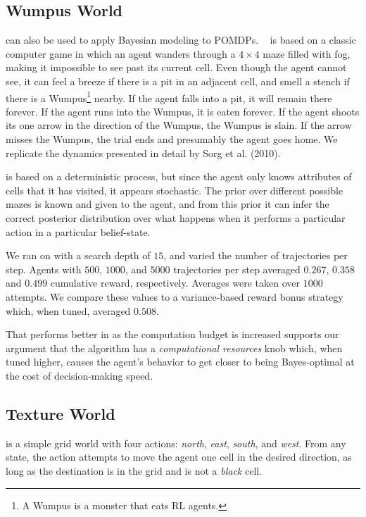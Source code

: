 \subsection{Wumpus World}

 can also be used to apply Bayesian modeling to POMDPs. ~\cite{russell94} is based on a classic computer game in which an agent wanders through a $4\times 4$ maze filled with fog, making it impossible to see past its current cell. Even though the agent cannot see, it can feel a breeze if there is a pit in an adjacent cell, and smell a stench if there is a Wumpus\footnote{A Wumpus is a monster that eats RL agents.} nearby. If the agent falls into a pit, it will remain there forever. If the agent runs into the Wumpus, it is eaten forever. If the agent shoots its one arrow in the direction of the Wumpus, the Wumpus is slain. If the arrow misses the Wumpus, the trial ends and presumably the agent goes home. We replicate the dynamics presented in detail by Sorg et al. (2010). %

 is based on a deterministic process, but since the agent only knows attributes of cells that it has visited, it appears stochastic. The prior over different possible mazes is known and given to the agent, and from this prior it can infer the correct posterior distribution over what happens when it performs a particular action in a particular belief-state.

We ran  on  with a search depth of $15$, and varied the number of trajectories per step. Agents with $500$, $1000$, and $5000$ trajectories per step averaged $0.267$, $0.358$ and $0.499$ cumulative reward, respectively. Averages were taken over $1000$ attempts. We compare these values to a variance-based reward bonus strategy~\cite{sorg10} which, when tuned, averaged $0.508$.

That  performs better in  as the computation budget is increased supports our argument that the algorithm has a \emph{computational resources} knob which, when tuned higher, causes the agent's behavior to get closer to being Bayes-optimal at the cost of decision-making speed.

\subsection{Texture World}

\label{sec:expr:tworld}

 is a simple grid world with four actions: \emph{north}, \emph{east}, \emph{south}, and \emph{west}. From any state, the action attempts to move the agent one cell in the desired direction, as long as the destination is in the grid and is not a \emph{black} cell.


